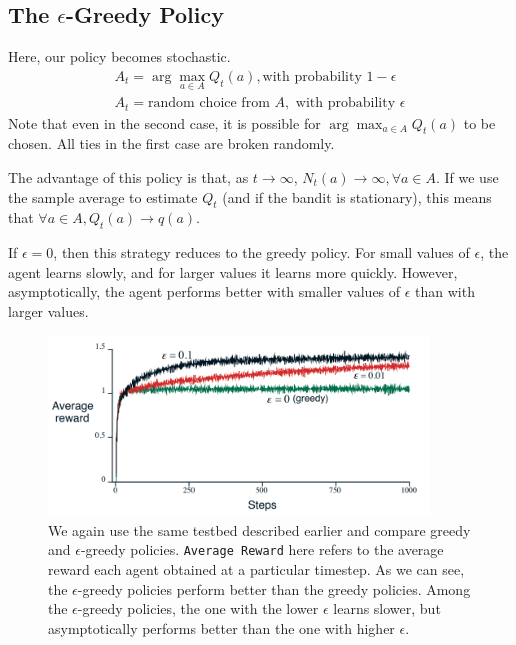 \documentclass[12pt]{report}
\begin{document}
\subsection{\texorpdfstring{The $\epsilon$-Greedy Policy}{}}
Here, our policy becomes stochastic.
\begin{eqnarray}
    A_{t} = \arg\max_{a \in A} Q_{t}(a), \text{with probability $1 - \epsilon$}\\
    A_{t} = \text{random choice from $A$}, \text{ with probability $\epsilon$}
\end{eqnarray}
Note that even in the second case, it is possible for $\arg\max_{a \in A} Q_{t}(a)$ to be chosen. All ties in the first case are broken randomly.

The advantage of this policy is that, as $t \rightarrow \infty$, $N_{t}(a) \rightarrow \infty, \forall a \in A$. If we use the sample average to estimate 
$Q_{t}$ (and if the bandit is stationary), this means that $\forall a \in A, Q_{t}(a) \rightarrow q(a)$.

If $\epsilon = 0$, then this strategy reduces to the greedy policy. For small values of $\epsilon$, the agent learns slowly, and for larger values it learns more quickly.
However, asymptotically, the agent performs better with smaller values of $\epsilon$ than with larger values.

\begin{figure}[H]
    \centering
    \includegraphics[width=0.9\textwidth]{images/Epsilon-greedy.png}
    \caption{We again use the same testbed described earlier and compare greedy and $\epsilon$-greedy policies. \texttt{Average Reward} here refers to the average reward each agent obtained at a particular timestep. As we can see, the $\epsilon$-greedy policies perform better than the greedy policies. Among the $\epsilon$-greedy policies, the one with the lower $\epsilon$ learns slower, but asymptotically performs better than the one with higher $\epsilon$.}
\end{figure}
\end{document}
